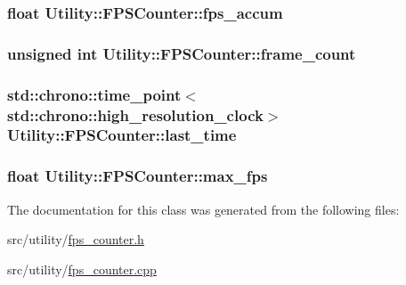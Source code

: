 \subsubsection[{fps\+\_\+accum}]{\setlength{\rightskip}{0pt plus 5cm}float Utility\+::\+F\+P\+S\+Counter\+::fps\+\_\+accum\hspace{0.3cm}{\ttfamily [private]}}\label{class_utility_1_1_f_p_s_counter_af222b6f51b284c7b735957b16e1187e3}
\hypertarget{class_utility_1_1_f_p_s_counter_a9040813170d766efb0f1d82f742292cc}{}
\subsubsection[{frame\+\_\+count}]{\setlength{\rightskip}{0pt plus 5cm}unsigned int Utility\+::\+F\+P\+S\+Counter\+::frame\+\_\+count\hspace{0.3cm}{\ttfamily [private]}}\label{class_utility_1_1_f_p_s_counter_a9040813170d766efb0f1d82f742292cc}
\hypertarget{class_utility_1_1_f_p_s_counter_ada67ad2c8564e63ee6e93251c40b257d}{}
\subsubsection[{last\+\_\+time}]{\setlength{\rightskip}{0pt plus 5cm}std\+::chrono\+::time\+\_\+point$<$std\+::chrono\+::high\+\_\+resolution\+\_\+clock$>$ Utility\+::\+F\+P\+S\+Counter\+::last\+\_\+time\hspace{0.3cm}{\ttfamily [private]}}\label{class_utility_1_1_f_p_s_counter_ada67ad2c8564e63ee6e93251c40b257d}
\hypertarget{class_utility_1_1_f_p_s_counter_a148c5309c9d72773cd39d5bb791642d4}{}
\subsubsection[{max\+\_\+fps}]{\setlength{\rightskip}{0pt plus 5cm}float Utility\+::\+F\+P\+S\+Counter\+::max\+\_\+fps\hspace{0.3cm}{\ttfamily [private]}}\label{class_utility_1_1_f_p_s_counter_a148c5309c9d72773cd39d5bb791642d4}


The documentation for this class was generated from the following files\+:\begin{DoxyCompactItemize}
\item 
src/utility/\hyperlink{fps__counter_8h}{fps\+\_\+counter.\+h}\item 
src/utility/\hyperlink{fps__counter_8cpp}{fps\+\_\+counter.\+cpp}\end{DoxyCompactItemize}
